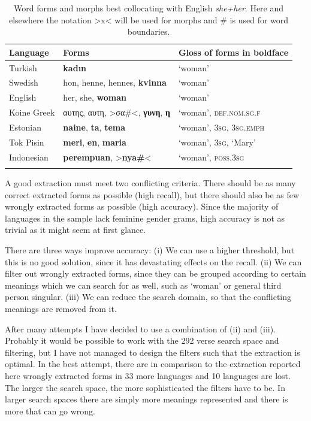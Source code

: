 \documentclass[output=collectionpaper]{langsci/langscibook}
\begin{document}
\begin{table}
\begin{tabular}{lll}
\lsptoprule
  Language	&	Forms	&	Gloss of forms in boldface	\\
\midrule
  Turkish	&	\textbf{kadın}	&	‘woman’	\\
  Swedish	&	hon, henne, hennes, \textbf{kvinna}	&	‘woman’	\\
  English	&	her, she, \textbf{woman}	&	‘woman’	\\
  Koine Greek	&	αυτης, αυτη, >σα\#<, \textbf{γυνη}, \textbf{η}	&	‘woman’, \textsc{def.nom.sg.f}	\\
  Estonian	&	\textbf{naine}, \textbf{ta}, \textbf{tema}	&	‘woman’, \textsc{3sg}, \textsc{3sg.emph}	\\
  Tok Pisin	&	\textbf{meri}, \textbf{en}, \textbf{maria}	&	‘woman’, \textsc{3sg}, ‘Mary’	\\
  Indonesian	&	\textbf{perempuan}, >\textbf{nya\#}<	&	‘woman’, \textsc{poss.3sg}	\\
\lspbottomrule
\end{tabular}
\caption{Word forms and morphs best collocating with English \textit{she+her}. Here and elsewhere the notation >x< will be used for morphs and \# is used for word boundaries.}
\label{tab:BW:1}
\end{table}

A good extraction must meet two conflicting criteria. There should be as many correct extracted forms as possible (high recall), but there should also be as few wrongly extracted forms as possible (high accuracy). Since the majority of languages in the sample lack feminine gender grams, high accuracy is not as trivial as it might seem at first glance.

There are three ways improve accuracy: (i) We can use a higher threshold, but this is no good solution, since it has devastating effects on the recall. (ii) We can filter out wrongly extracted forms, since they can be grouped according to certain meanings which we can search for as well, such as ‘woman’ or general third person singular. (iii) We can reduce the search domain, so that the conflicting meanings are removed from it.

After many attempts I have decided to use a combination of (ii) and (iii). Probably it would be possible to work with the 292 verse search space and filtering, but I have not managed to design the filters such that the extraction is optimal. In the best attempt, there are in comparison to the extraction reported here wrongly extracted forms in 33 more languages and 10 languages are lost. The larger the search space, the more sophisticated the filters have to be. In larger search spaces there are simply more meanings represented and there is more that can go wrong.
\end{document}
